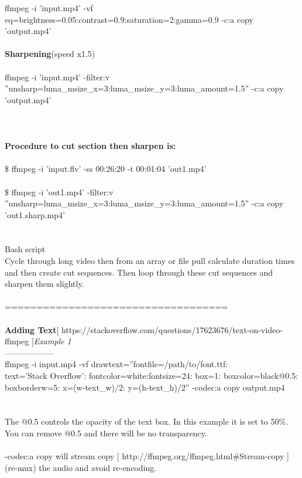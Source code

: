 \documentclass[10pt,a4paper]{article}
\begin{document}
{{{{{{{{{{{{{{ffmpeg -i 'input.mp4' -vf eq=brightness=0.05:contrast=0.9:saturation=2:gamma=0.9 -c:a copy 'output.mp4'\\
\\
\textbf{Sharpening}}{\Large   (speed x1.5)\\
\\
ffmpeg -i 'input.mp4' -filter:v ''unsharp=luma\_msize\_x=3:luma\_msize\_y=3:luma\_amount=1.5'' -c:a copy 'output.mp4'\\
\\
\\
\\
\textbf{Procedure to cut section then sharpen is:}}{\Large \\
\\
\$ ffmpeg -i 'input.flv' -ss 00:26:20 -t 00:01:04 'out1.mp4'\\
\\
\$ ffmpeg -i 'out1.mp4' -filter:v ''unsharp=luma\_msize\_x=3:luma\_msize\_y=3:luma\_amount=1.5'' -c:a copy 'out1.sharp.mp4'\\
\\
\\
Bash script\\
Cycle through long video then from an array or file pull calculate duration times and then create cut sequences. Then loop through these cut sequences and sharpen them slightly.\\
\\
===================================\\
\\
\textbf{Adding Text}}{\Large }[ https://stackoverflow.com/questions/17623676/text-on-video-ffmpeg ]{\Large \textit{Example 1}}{\Large \\
------------------\\
ffmpeg -i input.mp4 -vf drawtext=''fontfile=/path/to/font.ttf: \\ text='Stack Overflow': fontcolor=white:fontsize=24: box=1: boxcolor=black@0.5:}{\Large  \\boxborderw=5: x=(w-text\_w)/2: y=(h-text\_h)/2'' -codec:a copy output.mp4\\
\\
\\
The @0.5 controls the opacity of the text box. In this example it is set to 50\%. You can remove @0.5 and there will be no transparency.\\
\\
  -codec:a copy will stream copy} [ http://ffmpeg.org/ffmpeg.html\#Stream-copy ]{\Large  (re-mux) the audio and avoid re-encoding.\\
}}}}}}}}}}}}}}
\end{document}
